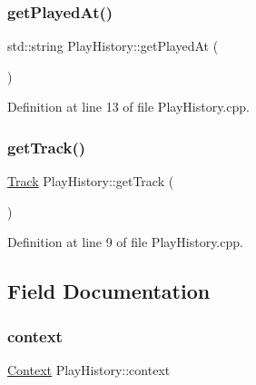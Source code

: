 \mbox{\label{class_play_history_a51e1bcd62d2f80aa7ebda7b2402a172f}} 
\subsubsection{\texorpdfstring{get\+Played\+At()}{getPlayedAt()}}
{\footnotesize\ttfamily std\+::string Play\+History\+::get\+Played\+At (\begin{DoxyParamCaption}{ }\end{DoxyParamCaption})}



Definition at line 13 of file Play\+History.\+cpp.

\mbox{\label{class_play_history_a6fbb2b15f1bf248aec7896850d0514d7}} 
\subsubsection{\texorpdfstring{get\+Track()}{getTrack()}}
{\footnotesize\ttfamily \mbox{\hyperlink{class_track}{Track}} Play\+History\+::get\+Track (\begin{DoxyParamCaption}{ }\end{DoxyParamCaption})}



Definition at line 9 of file Play\+History.\+cpp.



\subsection{Field Documentation}
\mbox{\label{class_play_history_a47d8a86c14434d7d41c285c4bb2e08cd}} 
\subsubsection{\texorpdfstring{context}{context}}
{\footnotesize\ttfamily \mbox{\hyperlink{class_context}{Context}} Play\+History\+::context\hspace{0.3cm}{\ttfamily [private]}}



